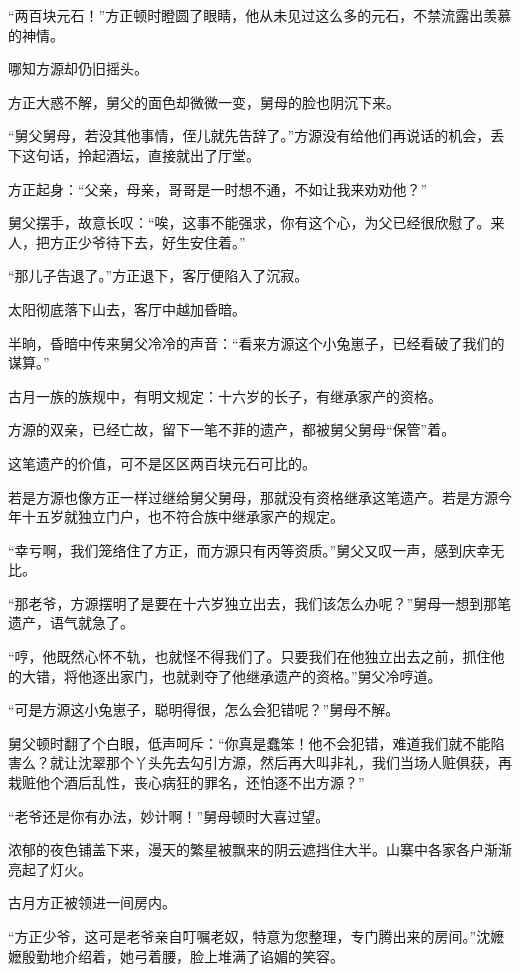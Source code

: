 \begin{this_body}
“两百块元石！”方正顿时瞪圆了眼睛，他从未见过这么多的元石，不禁流露出羡慕的神情。

哪知方源却仍旧摇头。

方正大惑不解，舅父的面色却微微一变，舅母的脸也阴沉下来。

“舅父舅母，若没其他事情，侄儿就先告辞了。”方源没有给他们再说话的机会，丢下这句话，拎起酒坛，直接就出了厅堂。

方正起身：“父亲，母亲，哥哥是一时想不通，不如让我来劝劝他？”

舅父摆手，故意长叹：“唉，这事不能强求，你有这个心，为父已经很欣慰了。来人，把方正少爷待下去，好生安住着。”

“那儿子告退了。”方正退下，客厅便陷入了沉寂。

太阳彻底落下山去，客厅中越加昏暗。

半晌，昏暗中传来舅父冷冷的声音：“看来方源这个小兔崽子，已经看破了我们的谋算。”

古月一族的族规中，有明文规定：十六岁的长子，有继承家产的资格。

方源的双亲，已经亡故，留下一笔不菲的遗产，都被舅父舅母“保管”着。

这笔遗产的价值，可不是区区两百块元石可比的。

若是方源也像方正一样过继给舅父舅母，那就没有资格继承这笔遗产。若是方源今年十五岁就独立门户，也不符合族中继承家产的规定。

“幸亏啊，我们笼络住了方正，而方源只有丙等资质。”舅父又叹一声，感到庆幸无比。

“那老爷，方源摆明了是要在十六岁独立出去，我们该怎么办呢？”舅母一想到那笔遗产，语气就急了。

“哼，他既然心怀不轨，也就怪不得我们了。只要我们在他独立出去之前，抓住他的大错，将他逐出家门，也就剥夺了他继承遗产的资格。”舅父冷哼道。

“可是方源这小兔崽子，聪明得很，怎么会犯错呢？”舅母不解。

舅父顿时翻了个白眼，低声呵斥：“你真是蠢笨！他不会犯错，难道我们就不能陷害么？就让沈翠那个丫头先去勾引方源，然后再大叫非礼，我们当场人赃俱获，再栽赃他个酒后乱性，丧心病狂的罪名，还怕逐不出方源？”

“老爷还是你有办法，妙计啊！”舅母顿时大喜过望。

浓郁的夜色铺盖下来，漫天的繁星被飘来的阴云遮挡住大半。山寨中各家各户渐渐亮起了灯火。

古月方正被领进一间房内。

“方正少爷，这可是老爷亲自叮嘱老奴，特意为您整理，专门腾出来的房间。”沈嬷嬷殷勤地介绍着，她弓着腰，脸上堆满了谄媚的笑容。


\end{this_body}
